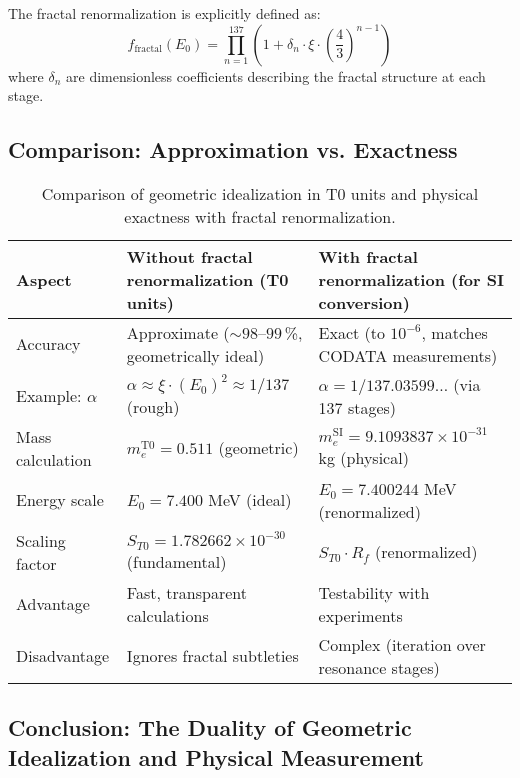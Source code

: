 \documentclass[12pt,a4paper]{article}
\begin{document}
	The fractal renormalization is explicitly defined as:
	\begin{equation}
		f_{\text{fractal}}(E_0) = \prod_{n=1}^{137} \left(1 + \delta_n \cdot \xi \cdot \left(\frac{4}{3}\right)^{n-1}\right)
	\end{equation}
	where $\delta_n$ are dimensionless coefficients describing the fractal structure at each stage.
	
	\subsection{Comparison: Approximation vs. Exactness}
	
	\begin{table}[h]
		\centering
		\begin{tabular}{p{4cm}p{6cm}p{6cm}}
			\toprule
			\textbf{Aspect} & \textbf{Without fractal renormalization (T0 units)} & \textbf{With fractal renormalization (for SI conversion)} \\
			\midrule
			Accuracy & Approximate ($\sim 98$--$99$\,\%, geometrically ideal) & Exact (to $10^{-6}$, matches CODATA measurements) \\
			Example: $\alpha$ & $\alpha \approx \xi \cdot (E_0)^2 \approx 1/137$ (rough) & $\alpha = 1/137.03599\dots$ (via 137 stages) \\
			Mass calculation & $m_e^{\mathrm{T0}} = 0.511$ (geometric) & $m_e^{\mathrm{SI}} = 9.1093837\times 10^{-31}$ kg (physical) \\
			Energy scale & $E_0 = 7.400$ MeV (ideal) & $E_0 = 7.400244$ MeV (renormalized) \\
			Scaling factor & $S_{T0} = 1.782662\times 10^{-30}$ (fundamental) & $S_{T0} \cdot R_f$ (renormalized) \\
			Advantage & Fast, transparent calculations & Testability with experiments \\
			Disadvantage & Ignores fractal subtleties & Complex (iteration over resonance stages) \\
			\bottomrule
		\end{tabular}
		\caption{Comparison of geometric idealization in T0 units and physical exactness with fractal renormalization.}
		\label{tab:approximation-exaktheit}
	\end{table}
	
	\subsection{Conclusion: The Duality of Geometric Idealization and Physical Measurement}
	
\end{document}

